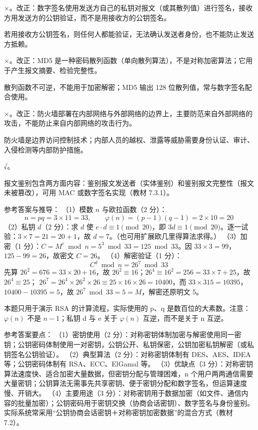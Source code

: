 \documentclass[a4paper,11pt]{article}
\begin{document}
\q ×。改正：数字签名使用发送方自己的私钥对报文（或其散列值）进行签名，接收方用发送方的公钥验证，而不是用接收方的公钥签名。\begin{analysis}若用接收方公钥签名，则任何人都能验证，无法确认发送者身份，也不能防止发送方抵赖。\end{analysis}

\q ×。改正：MD5 是一种密码散列函数（单向散列算法），不是对称加密算法；它用于产生报文摘要、检验完整性。\begin{analysis}散列函数不可逆，不能用于加密解密；MD5 输出 128 位散列值，常与数字签名配合使用。\end{analysis}

\q ×。改正：防火墙部署在内部网络与外部网络的边界上，主要防范来自外部网络的攻击，不能防止来自内部网络的攻击行为。\begin{analysis}防火墙是边界访问控制技术；内部人员的越权、泄露等威胁需要身份认证、审计、入侵检测等内部防护措施。\end{analysis}

\q √。\begin{analysis}报文鉴别包含两方面内容：鉴别报文发送者（实体鉴别）和鉴别报文完整性（报文未被篡改），可用 MAC 或数字签名实现（教材 7.3.1）。\end{analysis}


\q 参考答案与推导：
（1）模数 $n$ 与欧拉函数（2 分）：
\[
n=pq=3\times 11=33,\qquad \varphi(n)=(p-1)(q-1)=2\times 10=20
\]
（2）私钥 $d$（2 分）：求 $d$ 使 $e\cdot d\equiv 1\pmod{20}$，即 $3d\equiv 1\pmod{20}$。逐一试验：$3\times 7=21=20+1$，故 $d=7$。（也可用扩展欧几里得算法求得。）
（3）加密（1 分）：$C=M^{e}\bmod n=5^{3}\bmod 33=125\bmod 33$。因 $33\times 3=99$，$125-99=26$，故密文 $C=26$。
（4）解密验证（1 分）：
\[
C^{d}\bmod n=26^{7}\bmod 33
\]
先算 $26^{2}=676=33\times 20+16$，故 $26^{2}\equiv 16$；$26^{4}\equiv 16^{2}=256=33\times 7+25$，故 $26^{4}\equiv 25$；
$26^{7}=26^{4}\times 26^{2}\times 26\equiv 25\times 16\times 26=10400$，而 $33\times 315=10395$，$10400-10395=5$，故 $26^{7}\bmod 33=5=M$，解密还原明文 5。
\begin{analysis}本题只用于演示 RSA 的计算流程，实际使用的 p、q 是数百位的大素数。注意：$\varphi(n)$ 不是 $n-1$；私钥 d 与 e 关于 $\varphi(n)$ 互逆，而不是关于 n 互逆。\end{analysis}


\q 参考答案要点：
（1）密钥使用（2 分）：对称密钥体制加密与解密使用同一密钥；公钥密码体制使用一对密钥，公钥公开、私钥保密，公钥加密私钥解密（或私钥签名公钥验证）。
（2）典型算法（2 分）：对称密钥体制有 DES、AES、IDEA 等；公钥密码体制有 RSA、ECC、ElGamal 等。
（3）优缺点（3 分）：对称密钥算法速度快、适合加密大量数据，但密钥分配与管理困难，n 个用户两两通信需要大量密钥；公钥算法无需事先共享密钥、便于密钥分配和数字签名，但运算速度慢、开销大。
（4）主要用途（3 分）：对称密钥用于数据加密（如文件、通信内容的批量加密）；公钥密码用于密钥交换（协商会话密钥）、数字签名与身份鉴别。实际系统常采用“公钥协商会话密钥＋对称密钥加密数据”的混合方式（教材 7.2）。
\end{document}
